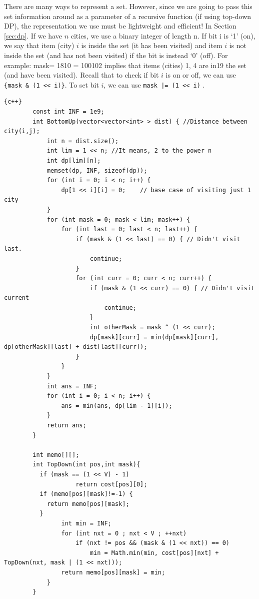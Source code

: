 \hspace{7mm}There are many ways to represent a set. However, since we are going to pass this set
information around as a parameter of a recursive function (if using top-down DP), the representation we use must be lightweight and efficient! In Section \ref{sec:dp}. If we have $n$ cities, we use a binary integer of length n. If bit i is ‘1’ (on), we say that item (city) $i$ is inside the set (it has been visited) and item $i$ is not inside the set (and has not been visited) if the bit is instead $‘0’$ (off). For example: mask= 1810 = 100102 implies that items (cities) {1, 4} are in19 the set (and have been visited). Recall that to check if bit $i$ is on or off, we can use \lstinline|{mask & (1 << i)}|. To set bit $i$, we can use \lstinline{mask |= (1 << i)} .

\begin{lstlisting}{c++}
        const int INF = 1e9;
        int BottomUp(vector<vector<int> > dist) { //Distance between city(i,j);
            int n = dist.size();
            int lim = 1 << n; //It means, 2 to the power n
            int dp[lim][n];
            memset(dp, INF, sizeof(dp));
            for (int i = 0; i < n; i++) {
                dp[1 << i][i] = 0;    // base case of visiting just 1 city
            }
            for (int mask = 0; mask < lim; mask++) {
                for (int last = 0; last < n; last++) {
                    if (mask & (1 << last) == 0) { // Didn't visit last.
                        continue;
                    }
                    for (int curr = 0; curr < n; curr++) {
                        if (mask & (1 << curr) == 0) { // Didn't visit current
                            continue;
                        }
                        int otherMask = mask ^ (1 << curr);
                        dp[mask][curr] = min(dp[mask][curr], dp[otherMask][last] + dist[last][curr]);
                    }
                }
            }
            int ans = INF;
            for (int i = 0; i < n; i++) {
                ans = min(ans, dp[lim - 1][i]);
            }
            return ans;
        }
        
        int memo[][];
        int TopDown(int pos,int mask){
          if (mask == (1 << V) - 1)
        			return cost[pos][0];
          if (memo[pos][mask]!=-1) {
            return memo[pos][mask];
          }
        		int min = INF;
        		for (int nxt = 0 ; nxt < V ; ++nxt)
        			if (nxt != pos && (mask & (1 << nxt)) == 0)
        				min = Math.min(min, cost[pos][nxt] + TopDown(nxt, mask | (1 << nxt)));
        		return memo[pos][mask] = min;
        	}
        }

\end{lstlisting}
